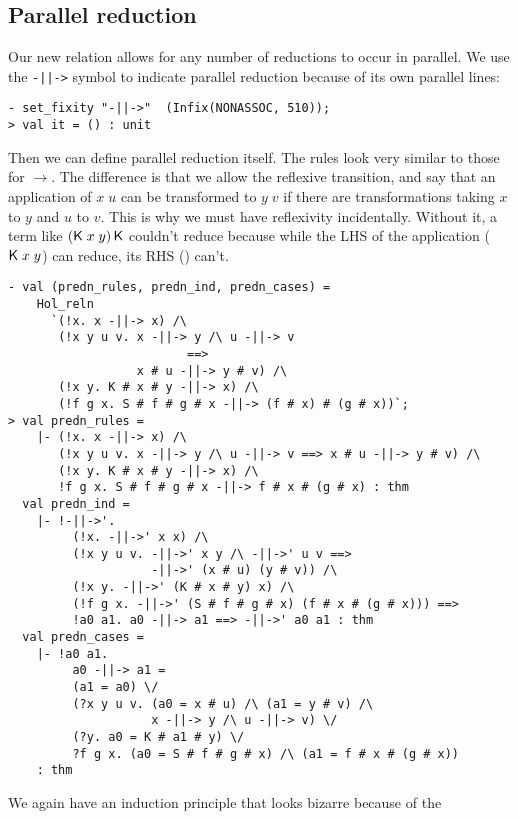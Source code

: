 \subsection{Parallel reduction}
\label{sec:Parallel-Reduction}

Our new relation allows for any number of reductions to occur in
parallel.  We use the \texttt{-||->} symbol to indicate parallel
reduction because of its own parallel lines:
\begin{session}\begin{verbatim}
- set_fixity "-||->"  (Infix(NONASSOC, 510));
> val it = () : unit
\end{verbatim}\end{session}
    Then we can define parallel reduction itself.  The rules look very
    similar to those for $\rightarrow$.  The difference is that we
    allow the reflexive transition, and say that an application of
    $x\;u$ can be transformed to $y\;v$ if there are transformations
    taking $x$ to $y$ and $u$ to $v$.  This is why we must have
    reflexivity incidentally.  Without it, a term like
    $({\sf K}\;x\;y)\,{\sf K}$ couldn't reduce because while the LHS of the
    application (${\sf K}\;x\;y$) can reduce, its RHS (\KC) can't.
\begin{session}\begin{verbatim}
- val (predn_rules, predn_ind, predn_cases) =
    Hol_reln
      `(!x. x -||-> x) /\
       (!x y u v. x -||-> y /\ u -||-> v
                         ==>
                  x # u -||-> y # v) /\
       (!x y. K # x # y -||-> x) /\
       (!f g x. S # f # g # x -||-> (f # x) # (g # x))`;
> val predn_rules =
    |- (!x. x -||-> x) /\
       (!x y u v. x -||-> y /\ u -||-> v ==> x # u -||-> y # v) /\
       (!x y. K # x # y -||-> x) /\
       !f g x. S # f # g # x -||-> f # x # (g # x) : thm
  val predn_ind =
    |- !-||->'.
         (!x. -||->' x x) /\
         (!x y u v. -||->' x y /\ -||->' u v ==>
                    -||->' (x # u) (y # v)) /\
         (!x y. -||->' (K # x # y) x) /\
         (!f g x. -||->' (S # f # g # x) (f # x # (g # x))) ==>
         !a0 a1. a0 -||-> a1 ==> -||->' a0 a1 : thm
  val predn_cases =
    |- !a0 a1.
         a0 -||-> a1 =
         (a1 = a0) \/
         (?x y u v. (a0 = x # u) /\ (a1 = y # v) /\
                    x -||-> y /\ u -||-> v) \/
         (?y. a0 = K # a1 # y) \/
         ?f g x. (a0 = S # f # g # x) /\ (a1 = f # x # (g # x))
    : thm
\end{verbatim}\end{session}
We again have an induction principle that looks bizarre because of the
